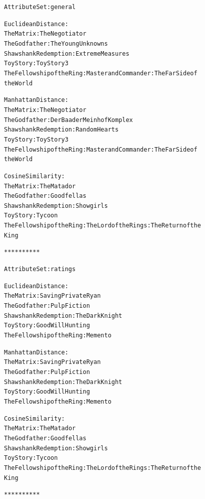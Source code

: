 \documentclass[letterpaper,10pt,english]{/usr/local/lib/python2.7/dist-packages/sphinx/texinputs/sphinxhowto}
\newenvironment{ColorVerbatim}
        {\begin{mdframed}[%
            roundcorner=1.0pt, %
            backgroundcolor=nbframe-bg, %
            userdefinedwidth=1\linewidth, %
            leftmargin=0.1\linewidth, %
            innerleftmargin=0pt, %
            innerrightmargin=0pt, %
            linecolor=nbframe-border, %
            linewidth=1pt, %
            usetwoside=false, %
            everyline=true, %
            innerlinewidth=3pt, %
            innerlinecolor=nbframe-bg, %
            middlelinewidth=1pt, %
            middlelinecolor=nbframe-bg, %
            outerlinewidth=0.5pt, %
            outerlinecolor=nbframe-border, %
            needspace=0pt
        ]}
        {\end{mdframed}}
\newenvironment{InvisibleVerbatim}
        {\begin{mdframed}[leftmargin=0.1\linewidth,innerleftmargin=3pt,innerrightmargin=3pt, userdefinedwidth=1\linewidth, linewidth=0pt, linecolor=white, usetwoside=false]}
        {\end{mdframed}}
\begin{document}
\begin{ColorVerbatim}
            
                \vspace{-0.2\baselineskip}
            
        \end{ColorVerbatim}
    

    

        
        

            
                \begin{InvisibleVerbatim}
                \vspace{-0.5\baselineskip}
\begin{alltt}Attribute Set: general

Euclidean Distance:
  The Matrix : The Negotiator
  The Godfather : The Young Unknowns
  Shawshank Redemption : Extreme Measures
  Toy Story : Toy Story 3
  The Fellowship of the Ring: Master and Commander: The Far Side of
the World

Manhattan Distance:
  The Matrix : The Negotiator
  The Godfather : Der Baader Meinhof Komplex
  Shawshank Redemption : Random Hearts
  Toy Story : Toy Story 3
  The Fellowship of the Ring: Master and Commander: The Far Side of
the World

Cosine Similarity:
  The Matrix : The Matador
  The Godfather : Goodfellas
  Shawshank Redemption : Showgirls
  Toy Story : Tycoon
  The Fellowship of the Ring: The Lord of the Rings: The Return of the
King

**********

Attribute Set: ratings

Euclidean Distance:
  The Matrix : Saving Private Ryan
  The Godfather : Pulp Fiction
  Shawshank Redemption : The Dark Knight
  Toy Story : Good Will Hunting
  The Fellowship of the Ring: Memento

Manhattan Distance:
  The Matrix : Saving Private Ryan
  The Godfather : Pulp Fiction
  Shawshank Redemption : The Dark Knight
  Toy Story : Good Will Hunting
  The Fellowship of the Ring: Memento

Cosine Similarity:
  The Matrix : The Matador
  The Godfather : Goodfellas
  Shawshank Redemption : Showgirls
  Toy Story : Tycoon
  The Fellowship of the Ring: The Lord of the Rings: The Return of the
King

**********


\end{alltt}
\end{InvisibleVerbatim}
\end{document}
